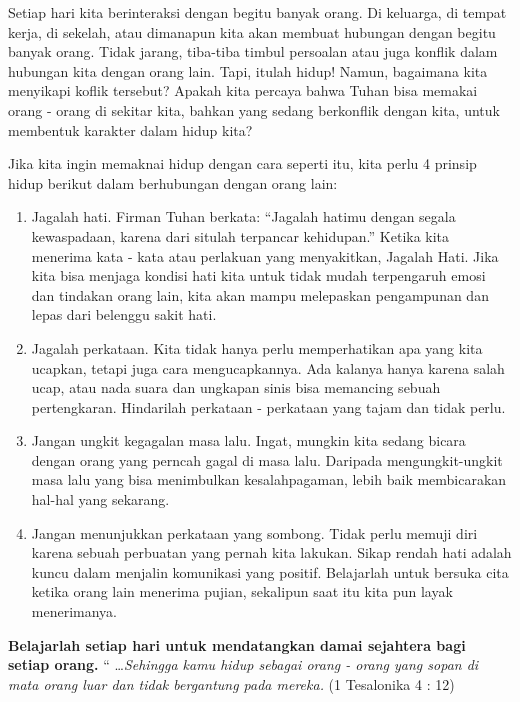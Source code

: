 
Setiap hari kita berinteraksi dengan begitu banyak orang. Di keluarga, di tempat kerja, di sekelah, atau dimanapun kita akan membuat hubungan dengan begitu banyak orang. Tidak jarang, tiba-tiba timbul persoalan atau juga konflik dalam hubungan kita dengan orang lain. Tapi, itulah hidup! Namun, bagaimana kita menyikapi koflik tersebut?
Apakah kita percaya bahwa Tuhan bisa memakai orang - orang di sekitar kita, bahkan yang sedang berkonflik dengan kita, untuk membentuk karakter dalam hidup kita?

Jika kita ingin memaknai hidup dengan cara seperti itu, kita perlu 4 prinsip hidup berikut dalam berhubungan dengan orang lain:
\begin{enumerate}
\item Jagalah hati. Firman Tuhan berkata: ``Jagalah hatimu dengan segala kewaspadaan, karena dari situlah terpancar kehidupan.'' Ketika kita menerima kata - kata atau perlakuan yang menyakitkan, Jagalah Hati. Jika kita bisa menjaga kondisi hati kita untuk tidak mudah terpengaruh emosi dan tindakan orang lain, kita akan mampu melepaskan pengampunan dan lepas dari belenggu sakit hati.
\item Jagalah perkataan. Kita tidak hanya perlu memperhatikan apa yang kita ucapkan, tetapi juga cara mengucapkannya. Ada kalanya hanya karena salah ucap, atau nada suara dan ungkapan sinis bisa memancing sebuah pertengkaran. Hindarilah perkataan - perkataan yang tajam dan tidak perlu.
\item Jangan ungkit kegagalan masa lalu. Ingat, mungkin kita sedang bicara dengan orang yang perncah gagal di masa lalu. Daripada mengungkit-ungkit masa lalu yang bisa menimbulkan kesalahpagaman, lebih baik membicarakan hal-hal yang sekarang.
\item Jangan menunjukkan perkataan yang sombong. Tidak perlu memuji diri karena sebuah perbuatan yang pernah kita lakukan. Sikap rendah hati adalah kuncu dalam menjalin komunikasi yang positif. Belajarlah untuk bersuka cita ketika orang lain menerima pujian, sekalipun saat itu kita pun layak menerimanya.
\end{enumerate}

\begin{center}
\textbf{Belajarlah setiap hari untuk mendatangkan damai sejahtera bagi setiap orang.}
`` \ldots \textit{Sehingga kamu hidup sebagai orang - orang yang sopan di mata orang luar dan tidak bergantung pada mereka.} (1 Tesalonika 4 : 12)
\end{center}

